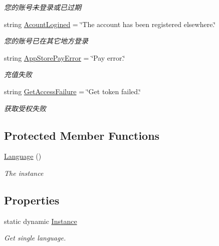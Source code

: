 \begin{DoxyCompactItemize}
\begin{DoxyCompactList}\small\item\em 您的账号未登录或已过期 \end{DoxyCompactList}\item 
string \mbox{\hyperlink{class_t_net_1_1_lang_1_1_language_a00b1d41e65935fe7b5589f4ec329b1a9}{Acount\+Logined}} = \char`\"{}The account has been registered elsewhere.\char`\"{}
\begin{DoxyCompactList}\small\item\em 您的账号已在其它地方登录 \end{DoxyCompactList}\item 
string \mbox{\hyperlink{class_t_net_1_1_lang_1_1_language_a721006a6bd95f0fc5d34c8e8565ce357}{App\+Store\+Pay\+Error}} = \char`\"{}Pay error.\char`\"{}
\begin{DoxyCompactList}\small\item\em 充值失败 \end{DoxyCompactList}\item 
string \mbox{\hyperlink{class_t_net_1_1_lang_1_1_language_a1083afdf1007d65e61edfbe6638ceedf}{Get\+Access\+Failure}} = \char`\"{}Get token failed.\char`\"{}
\begin{DoxyCompactList}\small\item\em 获取受权失败 \end{DoxyCompactList}\end{DoxyCompactItemize}
\subsection*{Protected Member Functions}
\begin{DoxyCompactItemize}
\item 
\mbox{\hyperlink{class_t_net_1_1_lang_1_1_language_a57ccd81a99a702a7f06b6dc0ef43a16d}{Language}} ()
\begin{DoxyCompactList}\small\item\em The instance \end{DoxyCompactList}\end{DoxyCompactItemize}
\subsection*{Properties}
\begin{DoxyCompactItemize}
\item 
static dynamic \mbox{\hyperlink{class_t_net_1_1_lang_1_1_language_a050dce524a6d108f4b39e6e5f47519bc}{Instance}}
\begin{DoxyCompactList}\small\item\em Get single language. \end{DoxyCompactList}\end{DoxyCompactItemize}


